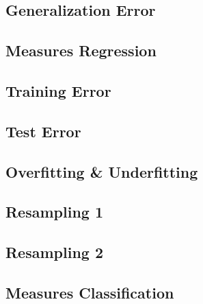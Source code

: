 

\subsection{Generalization Error}


\subsection{Measures Regression}


\subsection{Training Error}


\subsection{Test Error}


\subsection{Overfitting \& Underfitting}


\subsection{Resampling 1}


\subsection{Resampling 2}


\subsection{Measures Classification}


